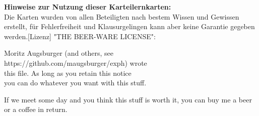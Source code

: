 %

\begin{karte}[Nutzungshinweis]{\textbf{Hinweise zur Nutzung dieser Karteilernkarten:}\\ Die Karten wurden von allen Beteiligten nach bestem Wissen und Gewissen erstellt, für Fehlerfreiheit und Klausurgelingen kann aber keine Garantie gegeben werden.}[Lizenz]
"THE BEER-WARE LICENSE":

Moritz Augsburger (and others, see \\
https://github.com/maugsburger/exph) wrote \\
this file. As long as you retain this notice\\
you can do whatever you want with this stuff.

If we meet some day and you think this stuff is worth it, you can buy me a beer or a coffee in       
return.                                                                  
\end{karte}
